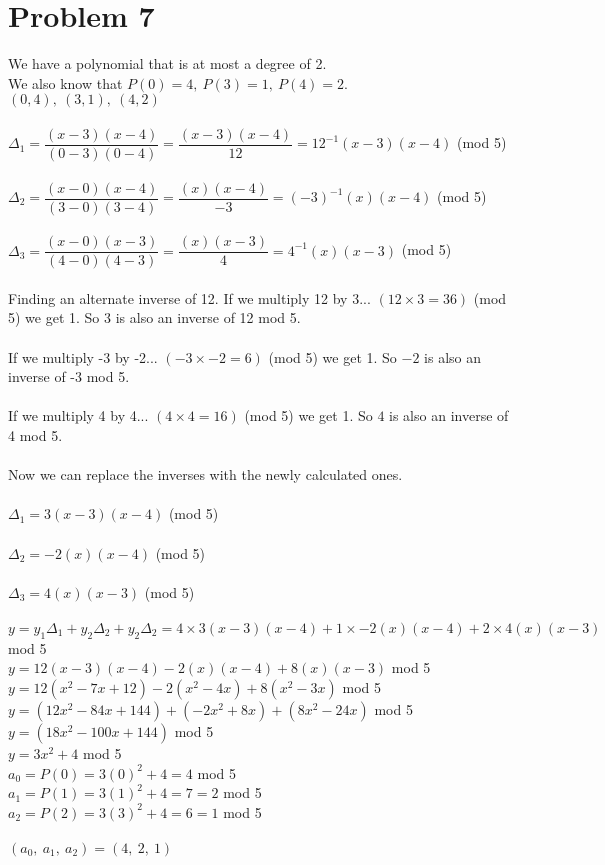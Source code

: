 \documentclass[11pt,letterpaper]{article}
\begin{document}
\section*{Problem 7}
We have a polynomial that is at most a degree of 2. \\We also know that $P(0)=4,~P(3)=1,~P(4)=2.$\\
$(0,4),~(3,1),~(4,2)$
\\\\
$\Delta_1 = \dfrac{(x-3)(x-4)}{(0-3)(0-4)} = \dfrac{(x-3)(x-4)}{12} = 12^{-1}(x-3)(x-4)$   (mod 5)\\\\
$\Delta_2 = \dfrac{(x-0)(x-4)}{(3-0)(3-4)} = \dfrac{(x)(x-4)}{-3}= (-3)^{-1}(x)(x-4)$ (mod 5)\\\\
$\Delta_3 = \dfrac{(x-0)(x-3)}{(4-0)(4-3)} = \dfrac{(x)(x-3)}{4} = 4^{-1}(x)(x-3)$ (mod 5)\\\\
Finding an alternate inverse of 12.
If we multiply 12 by 3... $(12\times3=36)$ (mod 5) we get 1. So 3 is also an inverse of 12 mod 5.\\\\
If we multiply -3 by -2... $(-3\times-2=6)$ (mod 5) we get 1. So $-2$ is also an inverse of -3 mod 5.\\\\
If we multiply 4 by 4... $(4\times4=16)$ (mod 5) we get 1. So $4$ is also an inverse of 4 mod 5.\\\\
Now we can replace the inverses with the newly calculated ones.\\\\
$\Delta_1 = 3(x-3)(x-4)$   (mod 5)\\\\
$\Delta_2 =-2(x)(x-4)$ (mod 5)\\\\
$\Delta_3 = 4(x)(x-3)$ (mod 5)\\\\
$y = y_1\Delta_1 + y_2\Delta_2+ y_2\Delta_2 = 4\times3(x-3)(x-4) + 1\times -2(x)(x-4) + 2\times 4(x)(x-3)$ mod 5\\
$y=12(x-3)(x-4)-2(x)(x-4)+8(x)(x-3)$ mod 5\\
$y= 12(x^2-7x+12)-2(x^2-4x)+8(x^2-3x)$ mod 5\\
$y= (12x^2-84x+144)+(-2x^2+8x)+(8x^2-24x)$ mod 5\\
$y= (18x^2-100x+144)$ mod 5\\
$y = 3x^2 + 4$ mod 5\\
$a_0 = P(0)= 3(0)^2 + 4 = 4$ mod 5\\
$a_1 = P(1)= 3(1)^2 + 4= 7=2$ mod 5\\
$a_2 = P(2)= 3(3)^2 + 4 = 6=1$ mod 5\\
\\
$(a_0,~a_1,~a_2) = (4,~2,~1)$
\end{document}
